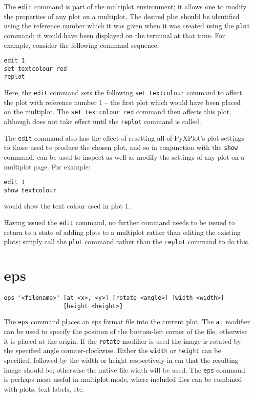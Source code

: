 \documentclass[a4paper,onecolumn,11pt]{book}
\begin{document}
The {\tt edit} command is part of the multiplot environment; it allows one to
modify the properties of any plot on a multiplot. The desired plot should be
identified using the reference number which it was given when it was created
using the {\tt plot} command; it would have been displayed on the terminal at
that time. For example, consider the following command sequence:

\begin{verbatim}
edit 1
set textcolour red
replot
\end{verbatim}

Here, the {\tt edit} command sets the following {\tt set textcolour} command to
affect the plot with reference number 1 -- the first plot which would have been
placed on the multiplot. The {\tt set textcolour red} command then affects this
plot, although does not take effect until the {\tt replot} command is called.

The {\tt edit} command also has the effect of resetting all of PyXPlot's plot
settings to those used to produce the chosen plot, and so in conjunction with
the {\tt show} command, can be used to inspect as well as modify the settings of
any plot on a multiplot page. For example:

\begin{verbatim}
edit 1
show textcolour
\end{verbatim}

\noindent would show the text colour used in plot 1.

Having issued the {\tt edit} command, no further command needs to be issued to
return to a state of adding plots to a multiplot rather than editing the
existing plots; simply call the {\tt plot} command rather than the {\tt replot}
command to do this.


\section{eps}

\begin{verbatim}
eps '<filename>' [at <x>, <y>] [rotate <angle>] [width <width>]
                 [height <height>]
\end{verbatim}

The {\tt eps} command places an eps format file into the current plot.  The
{\tt at} modifier can be used to specify the position of the bottom-left corner
of the file, otherwise it is placed at the origin.  If the {\tt rotate} modifier
is used the image is rotated by the specified angle counter-clockwise.  Either
the {\tt width} or {\tt height} can be specified, followed by the width or
height respectively in cm that the resulting image should be; otherwise the
native file width will be used.  The {\tt eps} command is perhaps most useful in
multiplot mode, where included files can be combined with plots, text labels,
etc.
\end{document}
